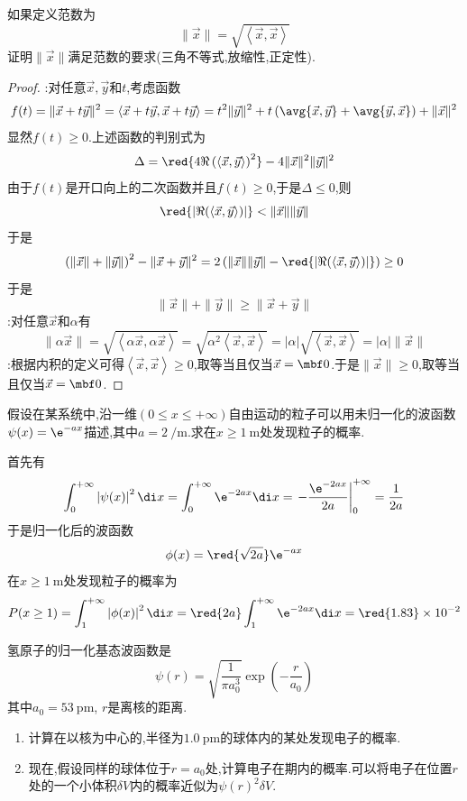 \documentclass{ctexart}
\begin{document}
\begin{homework}[6.]
    如果定义范数为
    \[\|\vec{x}\|=\sqrt{\left\langle\vec{x},\vec{x}\right\rangle}\]
    证明$\|\vec{x}\|$满足范数的要求(三角不等式,放缩性,正定性).
\end{homework}
\begin{proof}
    :对任意$\vec{x},\vec{y}$和$t$,考虑函数
    \[f(t)=\|\vec{x}+t\vec{y}\|^2=\left\langle\vec{x}+t\vec{y},\vec{x}+t\vec{y}\right\rangle=t^2\|\vec{y}\|^2+t\left(\avg{\vec{x},\vec{y}}+\avg{\vec{y},\vec{x}}\right)+\|\vec{x}\|^2\]
    显然$f(t)\geq0$.上述函数的判别式为
    \[\Delta=\red{4\Re\left(\left\langle\vec{x},\vec{y}\right\rangle\right)^2}-4\|\vec{x}\|^2\|\vec{y}\|^2\]
    由于$f(t)$是开口向上的二次函数并且$f(t)\geq0$,于是$\Delta\leq0$,则
    \[\red{\left|\Re(\left\langle\vec{x},\vec{y}\right\rangle)\right|}<\|\vec{x}\|\|\vec{y}\|\]
    于是
    \[\left(\|\vec{x}\|+\|\vec{y}\|\right)^2-\|\vec{x}+\vec{y}\|^2=2\left(\|\vec{x}\|\|\vec{y}\|-\red{\left|\Re(\left\langle\vec{x},\vec{y}\right\rangle)\right|}\right)\geq0\]
    于是
    \[\|\vec{x}\|+\|\vec{y}\|\geq\|\vec{x}+\vec{y}\|\]
    :对任意$\vec{x}$和$\alpha$有
    \[\|\alpha\vec{x}\|=\sqrt{\left\langle\alpha\vec{x},\alpha\vec{x}\right\rangle}=\sqrt{\alpha^2\left\langle\vec{x},\vec{x}\right\rangle}=|\alpha|\sqrt{\left\langle\vec{x},\vec{x}\right\rangle}=|\alpha|\|\vec{x}\|\]
    :根据内积的定义可得$\left\langle\vec{x},\vec{x}\right\rangle\geq0$,取等当且仅当$\vec{x}=\mbf0$.于是$\|\vec{x}\|\geq0$,取等当且仅当$\vec{x}=\mbf0$.
\end{proof}
\begin{homework}[7.]
    假设在某系统中,沿一维$(0\leq x\leq+\infty)$自由运动的粒子可以用未归一化的波函数$\psi(x)=\e^{-ax}$描述,其中$a=\SI{2}{\per\meter}$.求在$x\geq\SI{1}{\meter}$处发现粒子的概率.
\end{homework}
\begin{solution}
    首先有
    \[\int_{0}^{+\infty}\left|\psi(x)\right|^2\di x=\int_{0}^{+\infty}\e^{-2ax}\di x=\left.-\dfrac{\e^{-2ax}}{2a}\right|_0^{+\infty}=\dfrac{1}{2a}\]
    于是归一化后的波函数
    \[\phi(x)=\red{\sqrt{2a}}\e^{-ax}\]
    在$x\geq\SI{1}{\meter}$处发现粒子的概率为
    \[P(x\geq1)=\int_{1}^{+\infty}\left|\phi(x)\right|^2\di x=\red{2a}\int_{1}^{+\infty}\e^{-2ax}\di x=\red{1.83}\times10^{-2}\]
\end{solution}
\begin{homework}[8.]
    氢原子的归一化基态波函数是
    \[\psi(r)=\sqrt{\dfrac{1}{\pi a_0^3}}\exp\left(-\dfrac{r}{a_0}\right)\]
    其中$a_0=\SI{53}{\pico\meter}$, $r$是离核的距离.
    \begin{enumerate}[label=(\alph*)]
        \item 计算在以核为中心的,半径为$\SI{1.0}{\pico\meter}$的球体内的某处发现电子的概率.
        \item 现在,假设同样的球体位于$r=a_0$处,计算电子在期内的概率.可以将电子在位置$r$处的一个小体积$\delta V$内的概率近似为$\psi(r)^2\delta V$.
    \end{enumerate}
\end{homework}
\end{document}
